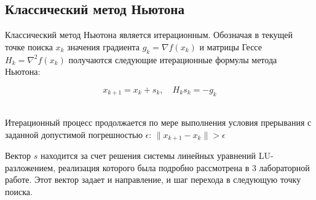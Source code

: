 \documentclass[12pt]{article}
\begin{document}
\newpage
\subsection{Классический метод Ньютона}

Классический метод Ньютона является итерационным. Обозначая в текущей точке поиска $x_k$ значения градиента $g_k = \nabla f(x_k)$ и матрицы Гессе $H_k = \nabla^2 f(x_k)$ получаются следующие итерационные формулы метода Ньютона:

\[ x_{k+1}=x_k+s_k, \quad H_k s_k = -g_k \]\

Итерационный процесс продолжается по мере выполнения условия прерывания с заданной допустимой погрешностью $\epsilon$: $\lVert x_{k+1} - x_k \rVert > \epsilon$

Вектор $s$ находится за счет решения системы линейных уравнений LU-разложением, реализация которого была подробно рассмотрена в 3 лабораторной работе. Этот вектор задает и направление, и шаг перехода в следующую точку поиска.
\end{document}
